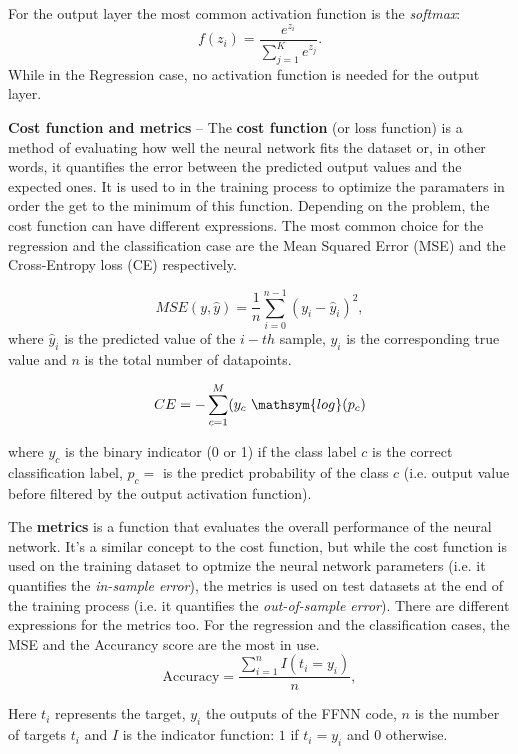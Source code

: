 \documentclass[english,notitlepage,reprint,nofootinbib]{revtex4-1}  %
\begin{document}
For the output layer the most common activation function is the \textit{softmax}:
$$
f(z_i) = \frac{e^{z_i}}{\sum_{j=1}^K e^{z_j}}.
$$
While in the Regression case, no activation function is needed for the output layer.

\textbf{Cost function and metrics}  – 
The \textbf{cost function} (or loss function) is a method of evaluating how well the neural network fits the dataset or, in other words, it quantifies the error between the predicted output values and the expected ones. It is used to in the training process to optimize the paramaters in order the get to the minimum of this function. Depending on the problem, the cost function can have different expressions. The most common choice for the regression and the classification case are the Mean Squared Error (MSE) and the Cross-Entropy loss (CE) respectively.

$$
MSE(y,\hat{y}) = \frac{1}{n}
\sum_{i=0}^{n-1}(y_i-\hat{y}_i)^2,
$$
where $\hat{y}_i$ is the predicted value of the $i-th$ sample, $y_i$ is the corresponding true value and $n$ is the total number of datapoints.

$$
CE = -
\sum_{c=1}^{M}(y_c \ \mathsym{log}(p_c)
$$

where $y_c$ is the binary indicator (0 or 1) if the class label $c$ is the correct classification label, $p_c=$ is the predict probability of the class $c$ (i.e. output value before filtered by the output activation function).

The \textbf{metrics} is a function that evaluates the overall performance of the neural network. It's a similar concept to the cost function, but while the cost function is used on the training dataset to optmize the neural network parameters (i.e. it quantifies the \textit{in-sample error}), the metrics is used on test datasets at the end of the training process (i.e. it quantifies the \textit{out-of-sample error}). There are different expressions for the metrics too. For the regression and the classification cases, the MSE and the Accurancy score are the most in use.
$$
\text{Accuracy} = \frac{\sum_{i=1}^n I(t_i = y_i)}{n} ,
$$

Here $t_i$ represents the target, $y_i$ the outputs of the FFNN code, $n$ is the number of targets $t_i$ and $I$ is the indicator function: $1$ if $t_i = y_i$ and $0$
otherwise.
\end{document}
